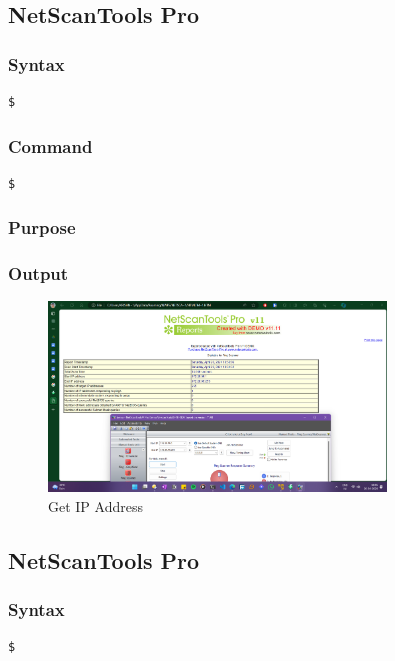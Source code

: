 \documentclass[11pt]{article}
\begin{document}
\subsection{NetScanTools Pro}

\subsubsection*{Syntax}
\begin{verbatim}
$
\end{verbatim}

\subsubsection*{Command}
\begin{verbatim}
$
\end{verbatim}

\subsubsection*{Purpose}

\subsubsection*{Output}
\begin{figure}[H]
    \centering
    \includegraphics[width=0.8\textwidth]{statdemo.png}
    \caption{Get IP Address}
    \label{fig:1}
\end{figure}

\subsection{NetScanTools Pro}

\subsubsection*{Syntax}
\begin{verbatim}
$
\end{verbatim}
\end{document}
